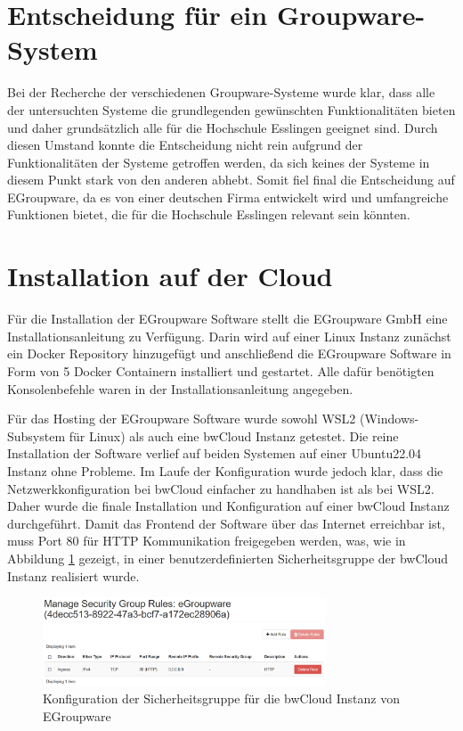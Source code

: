 \section{Entscheidung für ein Groupware-System}

Bei der Recherche der verschiedenen Groupware-Systeme wurde klar, dass alle der untersuchten Systeme die grundlegenden gewünschten Funktionalitäten bieten und daher grundsätzlich alle für die Hochschule Esslingen geeignet sind.
Durch diesen Umstand konnte die Entscheidung nicht rein aufgrund der Funktionalitäten der Systeme getroffen werden, da sich keines der Systeme in diesem Punkt stark von den anderen abhebt.
Somit fiel final die Entscheidung auf EGroupware, da es von einer deutschen Firma entwickelt wird und umfangreiche Funktionen bietet, die für die Hochschule Esslingen relevant sein könnten.




\section{Installation auf der Cloud}

Für die Installation der EGroupware Software stellt die EGroupware GmbH eine Installationsanleitung zu Verfügung.
Darin wird auf einer Linux Instanz zunächst ein Docker Repository hinzugefügt und anschließend die EGroupware Software in Form von 5 Docker Containern installiert und gestartet.
Alle dafür benötigten Konsolenbefehle waren in der Installationsanleitung angegeben. \autocite{egroupware-installation}

Für das Hosting der EGroupware Software wurde sowohl WSL2 (Windows-Subsystem für Linux) als auch eine bwCloud Instanz getestet.
Die reine Installation der Software verlief auf beiden Systemen auf einer Ubuntu22.04 Instanz ohne Probleme.
Im Laufe der Konfiguration wurde jedoch klar, dass die Netzwerkkonfiguration bei bwCloud einfacher zu handhaben ist als bei WSL2.
Daher wurde die finale Installation und Konfiguration auf einer bwCloud Instanz durchgeführt.
Damit das Frontend der Software über das Internet erreichbar ist, muss Port 80 für HTTP Kommunikation freigegeben werden, was, wie in Abbildung \ref{fig:bwcloud_security_group} gezeigt, in einer benutzerdefinierten Sicherheitsgruppe der bwCloud Instanz realisiert wurde.
\begin{figure}[H]
    \centering
    \includegraphics[width=0.75\textwidth]{images/bwCloud_SecurityGroup.png}
    \caption{Konfiguration der Sicherheitsgruppe für die bwCloud Instanz von EGroupware}
    \label{fig:bwcloud_security_group}
\end{figure}

